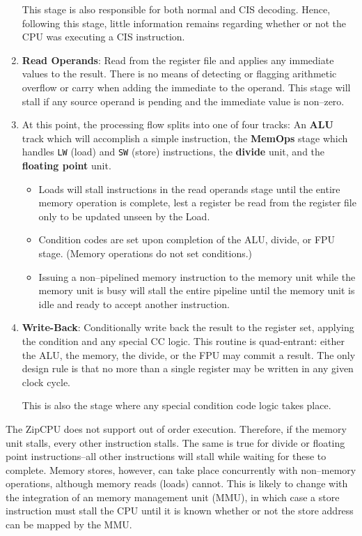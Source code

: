 \documentclass{gqtekspec}
\begin{document}
\begin{enumerate}
	This stage is also responsible for both normal and CIS decoding.
	Hence, following this stage, little information remains regarding
	whether or not the CPU was executing a CIS instruction.

\item {\bf Read Operands}: Read from the register file and applies any
	immediate values to the result.  There is no means of detecting or
	flagging arithmetic overflow or carry when adding the immediate to the
	operand.  This stage will stall if any source operand is pending
	and the immediate value is non--zero.

\item At this point, the processing flow splits into one of four tracks: An
	{\bf ALU} track which will accomplish a simple instruction, the
	{\bf MemOps} stage which handles {\tt LW} (load) and {\tt SW}
	(store) instructions, the {\bf divide} unit, and the
	{\bf floating point} unit.
	\begin{itemize}
	\item Loads will stall instructions in the read operands stage until
		the entire memory operation is complete, lest a register be
		read from the register file only to be updated unseen by the
		Load.
	\item Condition codes are set upon completion of the ALU, divide,
		or FPU stage.  (Memory operations do not set conditions.)
	\item Issuing a non--pipelined memory instruction to the memory unit
		while the memory unit is busy will stall the entire pipeline
		until the memory unit is idle and ready to accept another
		instruction.
	\end{itemize}
\item {\bf Write-Back}: Conditionally write back the result to the register
	set, applying the condition and any special CC logic.  This routine is
	quad-entrant: either the ALU, the memory, the divide, or the FPU may
	commit a result.  The only design rule is that no more than a single
	register may be written in any given clock cycle.

	This is also the stage where any special condition code logic takes
	place.
\end{enumerate}

The ZipCPU does not support out of order execution.  Therefore, if the memory
unit stalls, every other instruction stalls.  The same is true for divide or
floating point instructions--all other instructions will stall while waiting
for these to complete.  Memory stores, however, can take place concurrently
with non--memory operations, although memory reads (loads) cannot.  This is
likely to change with the integration of an memory management unit (MMU), in which case a store
instruction must stall the CPU until it is known whether or not the store
address can be mapped by the MMU.
\end{document}
